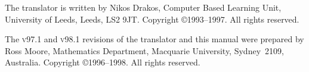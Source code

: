 \smallskip
{}\html{\\}%
The \latextohtml{} translator is written by Nikos Drakos, 
Computer Based Learning Unit,  University of Leeds,  Leeds,  LS2 9JT.
Copyright \copyright 1993--1997. All rights reserved.

\smallskip
{}\html{\\}%
The \textsc{v97.1} and \textsc{v98.1} revisions of the \latextohtml{} 
translator and this manual were prepared by
Ross Moore, Mathematics Department,  
Macquarie University,  Sydney~2109,  Australia.
Copyright \copyright 1996--1998. All rights reserved.








